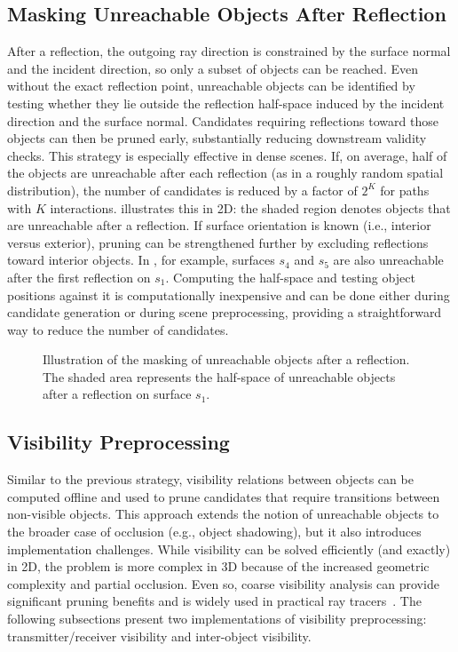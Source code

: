 \subsection{Masking Unreachable Objects After Reflection}

After a reflection, the outgoing ray direction is constrained by the surface normal and the incident direction, so only a subset of objects can be reached. Even without the exact reflection point, unreachable objects can be identified by testing whether they lie outside the reflection half-space induced by the incident direction and the surface normal. Candidates requiring reflections toward those objects can then be pruned early, substantially reducing downstream validity checks. This strategy is especially effective in dense scenes. If, on average, half of the objects are unreachable after each reflection (as in a roughly random spatial distribution), the number of candidates is reduced by a factor of $2^K$ for paths with $K$ interactions.  illustrates this in 2D: the shaded region denotes objects that are unreachable after a reflection. If surface orientation is known (i.e., interior versus exterior), pruning can be strengthened further by excluding reflections toward interior objects. In , for example, surfaces $s_4$ and $s_5$ are also unreachable after the first reflection on $s_1$. Computing the half-space and testing object positions against it is computationally inexpensive and can be done either during candidate generation or during scene preprocessing, providing a straightforward way to reduce the number of candidates.

\begin{figure}
  \centering
  \caption{Illustration of the masking of unreachable objects after a reflection. The shaded area represents the half-space of unreachable objects after a reflection on surface $s_1$.}
\end{figure}

\subsection{Visibility Preprocessing}

Similar to the previous strategy, visibility relations between objects can be computed offline and used to prune candidates that require transitions between non-visible objects. This approach extends the notion of unreachable objects to the broader case of occlusion (e.g., object shadowing), but it also introduces implementation challenges. While visibility can be solved efficiently (and exactly) in 2D, the problem is more complex in 3D because of the increased geometric complexity and partial occlusion. Even so, coarse visibility analysis can provide significant pruning benefits and is widely used in practical ray tracers~. The following subsections present two implementations of visibility preprocessing: transmitter/receiver visibility and inter-object visibility.

